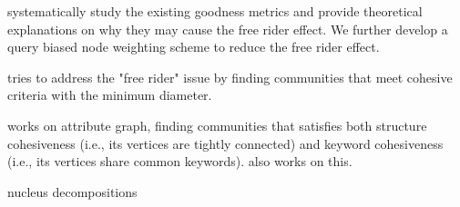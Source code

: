 \cite{wu2015robust} systematically study the existing goodness metrics and provide theoretical explanations on why they may cause the free rider effect. We further develop a query biased node weighting scheme to reduce the free rider effect. 

\cite{huang2015approximate} tries to address the "free rider" issue by finding communities that meet cohesive criteria with the minimum diameter.

\cite{fang2016effective} works on attribute graph, finding communities that satisfies both structure cohesiveness (i.e., its vertices are tightly connected) and keyword cohesiveness (i.e., its vertices share common keywords). \cite{huang2016attribute, shang2016agar, shang2017attribute,zhang2017visualizing,fang2017effective,huang2017attribute} also works on this.

\cite{sariyuce2017nucleus} nucleus decompositions